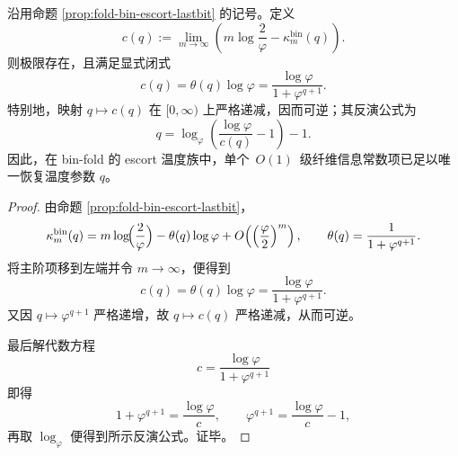 \begin{corollary}\label{cor:xi-time-part9o-escort-fiberinfo-constantterm-inversion}
沿用命题 \ref{prop:fold-bin-escort-lastbit} 的记号。定义
\[
c(q)
:=
\lim_{m\to\infty}
\left(
m\log\!\frac{2}{\varphi}
-\kappa_m^{\mathrm{bin}}(q)
\right).
\]
则极限存在，且满足显式闭式
\[
\boxed{\;
c(q)
=
\theta(q)\log\varphi
=
\frac{\log\varphi}{1+\varphi^{q+1}}.\;}
\]
特别地，映射 \(q\mapsto c(q)\) 在 \([0,\infty)\) 上严格递减，因而可逆；其反演公式为
\[
\boxed{\;
q
=
\log_\varphi\!\left(\frac{\log\varphi}{c(q)}-1\right)-1.\;}
\]
因此，在 bin-fold 的 escort 温度族中，单个 \(\,O(1)\,\) 级纤维信息常数项已足以唯一恢复温度参数 \(q\)。
\end{corollary}
\begin{proof}
由命题 \ref{prop:fold-bin-escort-lastbit}，
\[
\kappa_m^{\mathrm{bin}}(q)
=
m\log\!\Bigl(\frac{2}{\varphi}\Bigr)-\theta(q)\log\varphi
+O\!\left(\Bigl(\frac{\varphi}{2}\Bigr)^m\right),
\qquad
\theta(q)=\frac{1}{1+\varphi^{q+1}}.
\]
将主阶项移到左端并令 \(m\to\infty\)，便得到
\[
c(q)=\theta(q)\log\varphi=\frac{\log\varphi}{1+\varphi^{q+1}}.
\]
又因 \(q\mapsto \varphi^{q+1}\) 严格递增，故 \(q\mapsto c(q)\) 严格递减，从而可逆。

最后解代数方程
\[
c=\frac{\log\varphi}{1+\varphi^{q+1}}
\]
即得
\[
1+\varphi^{q+1}=\frac{\log\varphi}{c},
\qquad
\varphi^{q+1}=\frac{\log\varphi}{c}-1,
\]
再取 \(\log_\varphi\) 便得到所示反演公式。证毕。
\end{proof}

\endinput
